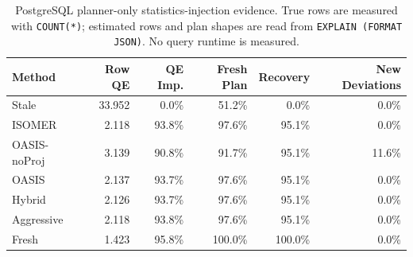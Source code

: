 \begin{table}[t]
  \centering
  \small
  \caption{PostgreSQL planner-only statistics-injection evidence. True rows are measured with \texttt{COUNT(*)}; estimated rows and plan shapes are read from \texttt{EXPLAIN (FORMAT JSON)}. No query runtime is measured.}
  \label{tab:postgres_planner_stats_injection}
  \setlength{\tabcolsep}{4pt}
  \begin{tabular}{lrrrrr}
    \toprule
    Method & Row QE & QE Imp. & Fresh Plan & Recovery & New Deviations \\
    \midrule
    Stale & 33.952 & 0.0\% & 51.2\% & 0.0\% & 0.0\% \\
    ISOMER & 2.118 & 93.8\% & 97.6\% & 95.1\% & 0.0\% \\
    OASIS-noProj & 3.139 & 90.8\% & 91.7\% & 95.1\% & 11.6\% \\
    OASIS & 2.137 & 93.7\% & 97.6\% & 95.1\% & 0.0\% \\
    Hybrid & 2.126 & 93.7\% & 97.6\% & 95.1\% & 0.0\% \\
    Aggressive & 2.118 & 93.8\% & 97.6\% & 95.1\% & 0.0\% \\
    Fresh & 1.423 & 95.8\% & 100.0\% & 100.0\% & 0.0\% \\
    \bottomrule
  \end{tabular}
\end{table}
